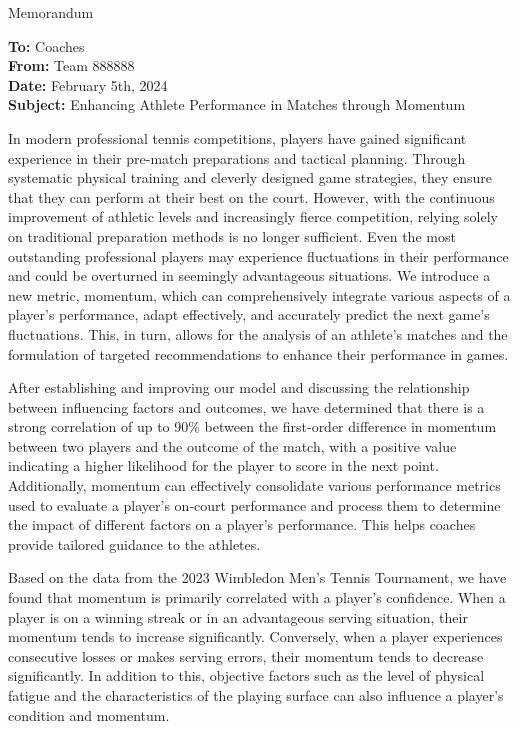 \documentclass[12pt]{article}
\begin{document}
\begin{letter}{Memorandum}
\begin{flushleft}  %
\textbf{To:} Coaches\\
\textbf{From:} Team 888888\\
\textbf{Date:} February 5th, 2024\\
\textbf{Subject:} Enhancing Athlete Performance in Matches through Momentum
\end{flushleft}

In modern professional tennis competitions, players have gained significant experience in their pre-match preparations and tactical planning. Through systematic physical training and cleverly designed game strategies, they ensure that they can perform at their best on the court. However, with the continuous improvement of athletic levels and increasingly fierce competition, relying solely on traditional preparation methods is no longer sufficient. Even the most outstanding professional players may experience fluctuations in their performance and could be overturned in seemingly advantageous situations. We introduce a new metric, momentum, which can comprehensively integrate various aspects of a player's performance, adapt effectively, and accurately predict the next game's fluctuations. This, in turn, allows for the analysis of an athlete's matches and the formulation of targeted recommendations to enhance their performance in games.

After establishing and improving our model and discussing the relationship between influencing factors and outcomes, we have determined that there is a strong correlation of up to 90\% between the first-order difference in momentum between two players and the outcome of the match, with a positive value indicating a higher likelihood for the player to score in the next point. Additionally, momentum can effectively consolidate various performance metrics used to evaluate a player's on-court performance and process them to determine the impact of different factors on a player's performance. This helps coaches provide tailored guidance to the athletes.

Based on the data from the 2023 Wimbledon Men's Tennis Tournament, we have found that momentum is primarily correlated with a player's confidence. When a player is on a winning streak or in an advantageous serving situation, their momentum tends to increase significantly. Conversely, when a player experiences consecutive losses or makes serving errors, their momentum tends to decrease significantly. In addition to this, objective factors such as the level of physical fatigue and the characteristics of the playing surface can also influence a player's condition and momentum.

\end{letter}
\end{document}
